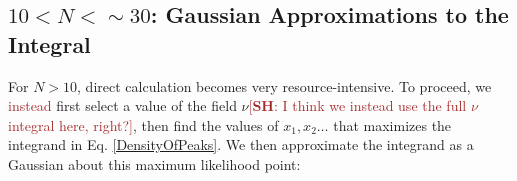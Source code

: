 \documentclass[12pt]{article}
\newcommand{\SH}[1]{\textcolor{brown}{[{\bf SH}: #1]}}
\newcommand{\sh}[1]{\textcolor{brown}{#1}}
\begin{document}


\subsection{$10 < N < \sim30$: Gaussian Approximations to the Integral}
For $N>10$, direct calculation becomes very resource-intensive. To proceed, we \sh{instead} first select a value of the field $\nu$\SH{I think we instead use the full $\nu$ integral here, right?}, then find the values of $x_1, x_2 \ldots$ that maximizes the integrand in Eq. \ref{DensityOfPeaks}. We then approximate the integrand as a Gaussian about this maximum likelihood point:
\end{document}
